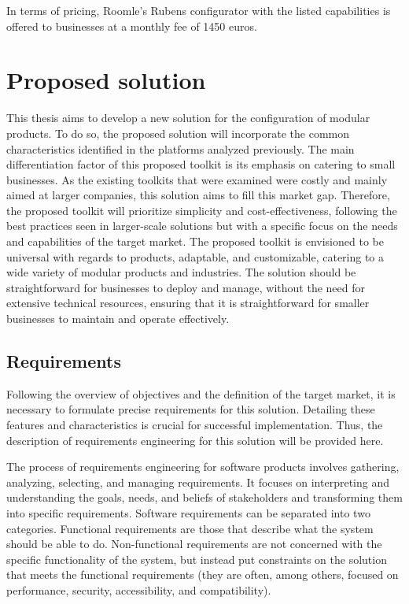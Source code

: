 In terms of pricing, Roomle's Rubens configurator with the listed capabilities is offered to businesses at a monthly fee of 1450 euros. \cite{RoomleFullLogic}

\section{Proposed solution}

This thesis aims to develop a new solution for the configuration of modular products. To do so, the proposed solution will incorporate the common characteristics identified in the platforms analyzed previously. The main differentiation factor of this proposed toolkit is its emphasis on catering to small businesses. As the existing toolkits that were examined were costly and mainly aimed at larger companies, this solution aims to fill this market gap. Therefore, the proposed toolkit will prioritize simplicity and cost-effectiveness, following the best practices seen in larger-scale solutions but with a specific focus on the needs and capabilities of the target market.
The proposed toolkit is envisioned to be universal with regards to products, adaptable, and customizable, catering to a wide variety of modular products and industries. The solution should be straightforward for businesses to deploy and manage, without the need for extensive technical resources, ensuring that it is straightforward for smaller businesses to maintain and operate effectively.

\subsection{Requirements}

Following the overview of objectives and the definition of the target market, it is necessary to formulate precise requirements for this solution. Detailing these features and characteristics is crucial for successful implementation. Thus, the description of requirements engineering for this solution will be provided here.

The process of requirements engineering for software products involves gathering, analyzing, selecting, and managing requirements. It focuses on interpreting and understanding the goals, needs, and beliefs of stakeholders and transforming them into specific requirements.
Software requirements can be separated into two categories. Functional requirements are those that describe what the system should be able to do. Non-functional requirements are not concerned with the specific functionality of the system, but instead put constraints on the solution that meets the functional requirements (they are often, among others, focused on performance, security, accessibility, and compatibility). \cite{Aurum2005}


